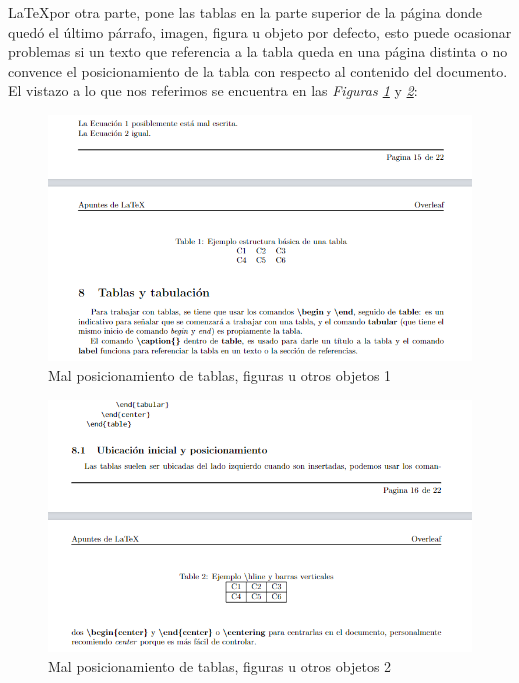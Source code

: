 \LaTeX por otra parte, pone las tablas en la parte superior de la página donde quedó el último párrafo, imagen, figura u objeto por defecto, esto puede ocasionar problemas si un texto que referencia a la tabla queda en una página distinta o no convence el posicionamiento de la tabla con respecto al contenido del documento. El vistazo a lo que nos referimos se encuentra en las \textit{Figuras \ref{fig: 2}} y \textit{\ref{fig: 3}}:
\begin{figure}[H]
    \begin{center}
        \caption{Mal posicionamiento de tablas, figuras u otros objetos 1}
        \label{fig: 2}
        \includegraphics[width=\textwidth]{recursos/tablas_mal pos_1.png}
    \end{center}
\end{figure}
\begin{figure}[H]
    \begin{center}
        \caption{Mal posicionamiento de tablas, figuras u otros objetos 2}
        \label{fig: 3}
        \includegraphics[width=\textwidth]{recursos/tablas_mal pos_2.png}
    \end{center}
\end{figure}

